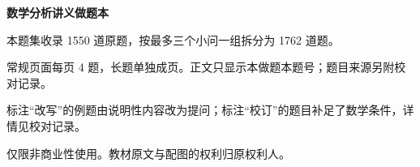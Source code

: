 \documentclass[UTF8,a4paper,12pt,fontset=fandol]{ctexart}
\begin{document}
\thispagestyle{empty}
\begin{center}{\LARGE\bfseries 数学分析讲义做题本}\par\vspace{6mm}{\large 完整题集}\end{center}
本题集收录 1550 道原题，按最多三个小问一组拆分为 1762 道题。

常规页面每页 4 题，长题单独成页。正文只显示本做题本题号；题目来源另附校对记录。

标注“改写”的例题由说明性内容改为提问；标注“校订”的题目补足了数学条件，详情见校对记录。

仅限非商业性使用。教材原文与配图的权利归原权利人。
\tableofcontents\clearpage
\clearpage
\clearpage
\clearpage
\clearpage
\clearpage
\clearpage
\clearpage
\clearpage
\clearpage
\clearpage
\clearpage
\clearpage
\clearpage
\clearpage
\clearpage
\clearpage
\clearpage
\clearpage
\end{document}
